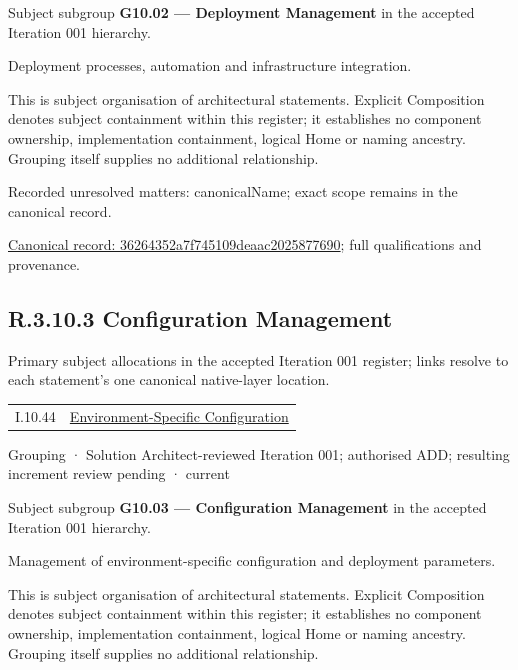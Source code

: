 Subject subgroup \textbf{G10.02 — Deployment Management} in the accepted Iteration 001 hierarchy.



Deployment processes, automation and infrastructure integration.



This is subject organisation of architectural statements. Explicit Composition denotes subject containment within this register; it establishes no component ownership, implementation containment, logical Home or naming ancestry. Grouping itself supplies no additional relationship.


{\small Recorded unresolved matters: canonicalName; exact scope remains in the canonical record.}\par
{\footnotesize \href{../../../../continuum/grouping/36264352a7f745109deaac2025877690.md}{Canonical record: 36264352a7f745109deaac2025877690}; full qualifications and provenance.}\par
\subsection*{R.3.10.3 Configuration Management}
\label{navigation:R.3.10.3}

Primary subject allocations in the accepted Iteration 001 register; links resolve to each statement’s one canonical native-layer location.\par
\begin{longtable}{p{.22\linewidth}p{.73\linewidth}}
I.10.44 & \hyperref[element:48e5415eff454e3e9e987506999e62f2]{Environment-Specific Configuration} \\
\end{longtable}
\label{element:ef476f07cd9e4ba6bdac99dc6e940baa}
{\small Grouping · Solution Architect-reviewed Iteration 001; authorised ADD; resulting increment review pending · current}\par

Subject subgroup \textbf{G10.03 — Configuration Management} in the accepted Iteration 001 hierarchy.



Management of environment-specific configuration and deployment parameters.



This is subject organisation of architectural statements. Explicit Composition denotes subject containment within this register; it establishes no component ownership, implementation containment, logical Home or naming ancestry. Grouping itself supplies no additional relationship.


